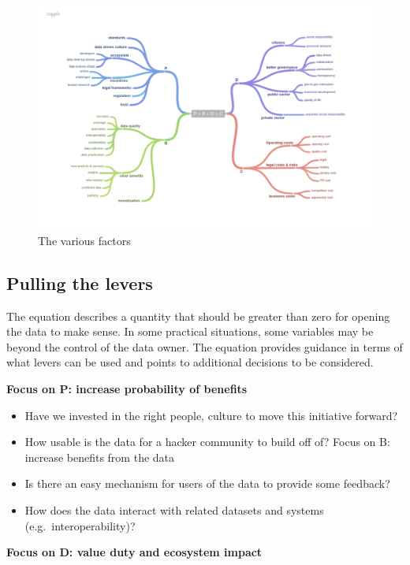 \documentclass[]{acm_proc_article-sp}
\begin{document}
\begin{figure}[htbp]
\centering
\includegraphics[width=\textwidth]{images/pbdc_equation.png}
\caption{The various factors}
\end{figure}

\subsection{Pulling the levers}\label{pulling-the-levers}

The equation describes a quantity that should be greater than zero for
opening the data to make sense. In some practical situations, some
variables may be beyond the control of the data owner. The equation
provides guidance in terms of what levers can be used and points to
additional decisions to be considered.

\textbf{Focus on P: increase probability of benefits} \vspace{0mm}

\begin{itemize}
\itemsep1pt\parskip0pt
\item
  Have we invested in the right people, culture to move this initiative
  forward?
\item
  How usable is the data for a hacker community to build off of? Focus
  on B: increase benefits from the data
\item
  Is there an easy mechanism for users of the data to provide some
  feedback?
\item
  How does the data interact with related datasets and systems
  (e.g.~interoperability)?
\end{itemize}

\textbf{Focus on D: value duty and ecosystem impact} \vspace{0mm}
\end{document}
